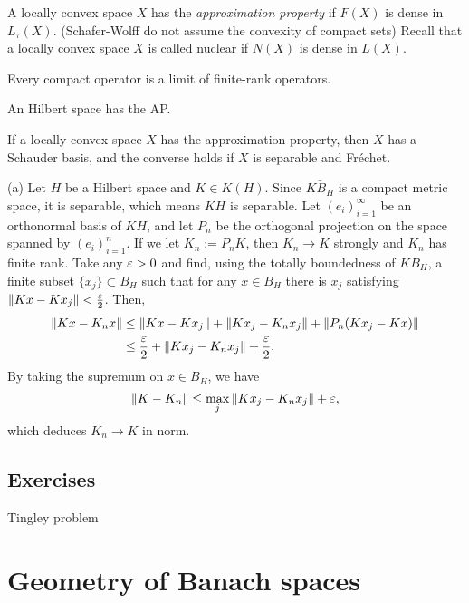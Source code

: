 \documentclass{../../large}
\begin{document}
\begin{prb}
A locally convex space $X$ has the \emph{approximation property} if $F(X)$ is dense in $L_\tau(X)$.
(Schafer-Wolff do not assume the convexity of compact sets)
Recall that a locally convex space $X$ is called nuclear if $N(X)$ is dense in $L(X)$.


Every compact operator is a limit of finite-rank operators.
\begin{parts}
\item An Hilbert space has the AP.
\item If a locally convex space $X$ has the approximation property, then $X$ has a Schauder basis, and the converse holds if $X$ is separable and Fr\'echet.
\end{parts}
\end{prb}
\begin{pf}
(a)
Let $H$ be a Hilbert space and $K\in K(H)$.
Since $\bar{KB_H}$ is a compact metric space, it is separable, which means $\bar{KH}$ is separable.
Let $(e_i)_{i=1}^\infty$ be an orthonormal basis of $\bar{KH}$, and let $P_n$ be the orthogonal projection on the space spanned by $(e_i)_{i=1}^n$.
If we let $K_n:=P_nK$, then $K_n\to K$ strongly and $K_n$ has finite rank.
Take any $\varepsilon>0$ and find, using the totally boundedness of $KB_H$, a finite subset $\{x_j\}\subset B_H$ such that for any $x\in B_H$ there is $x_j$ satisfying $\|Kx-Kx_j\|<\frac{\varepsilon}2$.
Then,
\begin{align*}
\|Kx-K_nx\|
&\le\|Kx-Kx_j\|+\|Kx_j-K_nx_j\|+\|P_n(Kx_j-Kx)\|\\
&\le\frac{\varepsilon}2+\|Kx_j-K_nx_j\|+\frac{\varepsilon}2.
\end{align*}
By taking the supremum on $x\in B_H$, we have
\[\|K-K_n\|\le\max_j\|Kx_j-K_nx_j\|+\varepsilon,\]
which deduces $K_n\to K$ in norm.

\end{pf}




\section*{Exercises}
Tingley problem



\chapter{Geometry of Banach spaces}


\section{}
\end{document}
